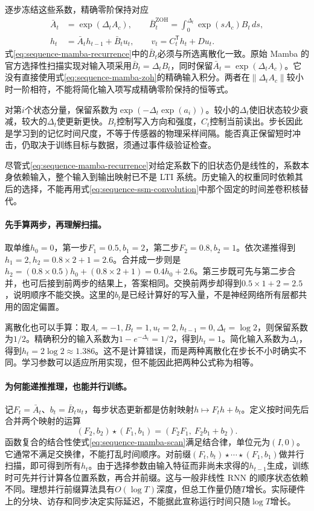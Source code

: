 逐步冻结这些系数，精确零阶保持对应
\begin{align}
 \bar A_t&=\exp(\Delta_t A_c),\qquad
 \bar B_t^{\mathrm{ZOH}}=\int_0^{\Delta_t}\exp(sA_c)B_t\,ds,
 \label{eq:sequence-mamba-zoh}\\
 h_t&=\bar A_t h_{t-1}+\bar B_t u_t,\qquad
 v_t=C_t^{\mathsf T}h_t+Du_t.
 \label{eq:sequence-mamba-recurrence}
\end{align}
式\eqref{eq:sequence-mamba-recurrence}中的$\bar B_t$必须与所选离散化一致。原始 Mamba 的官方选择性扫描实现对输入项采用$\bar B_t=\Delta_t B_t$，同时保留$\bar A_t=\exp(\Delta_t A_c)$。它没有直接使用式\eqref{eq:sequence-mamba-zoh}的精确输入积分。两者在$\|\Delta_t A_c\|$较小时一阶相符，不能将简化输入项写成精确零阶保持的恒等式。

对第$i$个状态分量，保留系数为$\exp(-\Delta_t\exp(a_i))$。较小的$\Delta_t$使旧状态较少衰减，较大的$\Delta_t$使更新更快。$B_t$控制写入方向和强度，$C_t$控制当前读出。步长因此是学习到的记忆时间尺度，不等于传感器的物理采样间隔。能否真正保留短时冲击，仍取决于训练目标与数据，须通过事件级验证检查。

尽管式\eqref{eq:sequence-mamba-recurrence}对给定系数下的旧状态仍是线性的，系数本身依赖输入，整个输入到输出映射已不是 LTI 系统。历史输入的权重同时依赖其后的选择，不能再用式\eqref{eq:sequence-ssm-convolution}中那个固定的时间差卷积核替代。

\paragraph{先手算两步，再理解扫描。}
取单维$h_0=0$，第一步$F_1=0.5,b_1=2$，第二步$F_2=0.8,b_2=1$。依次递推得到$h_1=2,h_2=0.8\times2+1=2.6$。合并成一步则是$h_2=(0.8\times0.5)h_0+(0.8\times2+1)=0.4h_0+2.6$。第三步既可先与第二步合并，也可后接到前两步的结果上，答案相同。交换前两步却得到$0.5\times1+2=2.5$，说明顺序不能交换。这里的$b_t$是已经计算好的写入量，不是神经网络所有层都共用的固定偏置。

离散化也可以手算：取$A_c=-1,B_t=1,u_t=2,h_{t-1}=0,\Delta_t=\log2$，则保留系数为$1/2$。精确积分的输入系数为$1-e^{-\Delta_t}=1/2$，得到$h_t=1$。简化输入系数为$\Delta_t$，得到$h_t=2\log2\approx1.386$。这不是计算错误，而是两种离散化在步长不小时确实不同。学习参数可以适应所用实现，但不能因此把两种公式称为相等。

\paragraph{为何能递推推理，也能并行训练。}
记$F_t=\bar A_t$、$b_t=\bar B_t u_t$，每步状态更新都是仿射映射$h\mapsto F_t h+b_t$。定义按时间先后合并两个映射的运算
\begin{equation}
 (F_2,b_2)\star(F_1,b_1)
   =(F_2F_1,\ F_2b_1+b_2).
 \label{eq:sequence-mamba-scan}
\end{equation}
函数复合的结合性使式\eqref{eq:sequence-mamba-scan}满足结合律，单位元为$(I,0)$。它通常不满足交换律，不能打乱时间顺序。对前缀$(F_t,b_t)\star\cdots\star(F_1,b_1)$做并行扫描，即可得到所有$h_t$。由于选择参数由输入特征而非尚未求得的$h_{t-1}$生成，训练时可先并行计算各位置系数，再合并前缀。这与一般非线性 RNN 的顺序状态依赖不同。理想并行前缀算法具有$O(\log T)$深度，但总工作量仍随$T$增长。实际硬件上的分块、访存和同步决定实际延迟，不能据此宣称运行时间只随$\log T$增长。

